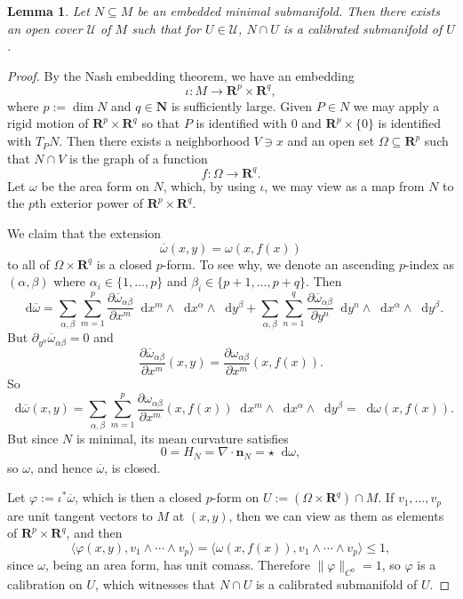 \documentclass[reqno,11pt]{amsart}
\newcommand{\NN}{\mathbf{N}}
\newcommand{\RR}{\mathbf{R}}
\newcommand*\dif{\mathop{}\!\mathrm{d}}
\newcommand{\normal}{\mathbf n}
\newtheorem{lemma}[theorem]{Lemma}
\theoremstyle{definition}
\numberwithin{equation}{section}
\begin{document}
\begin{lemma}\label{minimal implies locally calibrated}
Let $N \subseteq M$ be an embedded minimal submanifold.
Then there exists an open cover $\mathcal U$ of $M$ such that for $U \in \mathcal U$, $N \cap U$ is a calibrated submanifold of $U$.
\end{lemma}
\begin{proof}
By the Nash embedding theorem, we have an embedding
$$\iota: M \to \RR^p \times \RR^q,$$
where $p := \dim N$ and $q \in \NN$ is sufficiently large.
Given $P \in N$ we may apply a rigid motion of $\RR^p \times \RR^q$ so that $P$ is identified with $0$ and $\RR^p \times \{0\}$ is identified with $T_P N$.
Then there exists a neighborhood $V \ni x$ and an open set $\Omega \subseteq \RR^p$ such that $N \cap V$ is the graph of a function
$$f: \Omega \to \RR^q.$$
Let $\omega$ be the area form on $N$, which, by using $\iota$, we may view as a map from $N$ to the $p$th exterior power of $\RR^p \times \RR^q$.

We claim that the extension
$$\overline \omega(x, y) = \omega(x, f(x))$$
to all of $\Omega \times \RR^q$ is a closed $p$-form.
To see why, we denote an ascending $p$-index as $(\alpha, \beta)$ where $\alpha_i \in \{1, \dots, p\}$ and $\beta_i \in \{p + 1, \dots, p + q\}$.
Then
$$\dif \overline \omega = \sum_{\alpha, \beta} \sum_{m = 1}^p \frac{\partial \overline \omega_{\alpha \beta}}{\partial x^m} \dif x^m \wedge \dif x^\alpha \wedge \dif y^\beta +  \sum_{\alpha, \beta} \sum_{n = 1}^q \frac{\partial \overline \omega_{\alpha \beta}}{\partial y^n} \dif y^n \wedge \dif x^\alpha \wedge \dif y^\beta.$$
But $\partial_{y^n} \overline \omega_{\alpha \beta} = 0$ and
$$\frac{\partial \overline \omega_{\alpha \beta}}{\partial x^m}(x, y) = \frac{\partial \omega_{\alpha \beta}}{\partial x^m}(x, f(x)).$$
So 
$$\dif \overline \omega(x, y) = \sum_{\alpha, \beta} \sum_{m = 1}^p \frac{\partial \omega_{\alpha \beta}}{\partial x^m}(x, f(x)) \dif x^m \wedge \dif x^\alpha \wedge \dif y^\beta = \dif \omega(x, f(x)).$$
But since $N$ is minimal, its mean curvature satisfies 
$$0 = H_N = \nabla \cdot \normal_N = \star \dif \omega,$$
so $\omega$, and hence $\overline \omega$, is closed.

Let $\varphi := \iota^* \overline \omega$, which is then a closed $p$-form on $U := (\Omega \times \RR^q) \cap M$.
If $v_1, \dots, v_p$ are unit tangent vectors to $M$ at $(x, y)$, then we can view as them as elements of $\RR^p \times \RR^q$, and then
$$\langle \varphi(x, y), v_1 \wedge \cdots \wedge v_p\rangle = \langle \omega(x, f(x)), v_1 \wedge \cdots \wedge v_p\rangle \leq 1,$$
since $\omega$, being an area form, has unit comass.
Therefore $\|\varphi\|_{C^0} = 1$, so $\varphi$ is a calibration on $U$, which witnesses that $N \cap U$ is a calibrated submanifold of $U$.
\end{proof}
\end{document}
